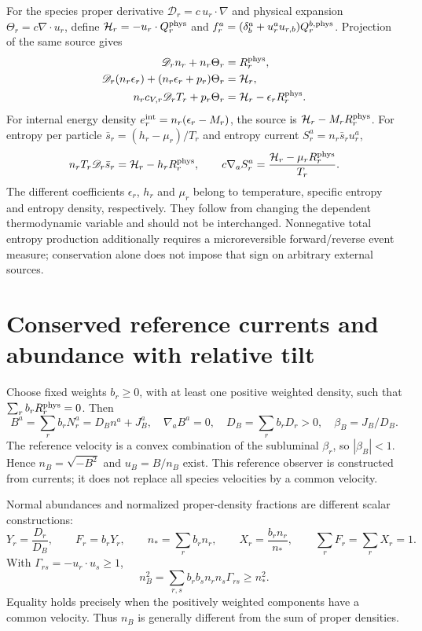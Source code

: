 For the species proper derivative $\mathscr D_r=c\,u_r\cdot\nabla$ and physical expansion $\Theta_r=c\nabla\cdot u_r$, define
$\mathcal H_r=-u_r\cdot Q_r^{\rm phys}$ and
$f_r^a=(\delta^a_b+u_r^au_{r,b})Q_r^{b,\rm phys}$.
Projection of the same source gives
\begin{align}
 \mathscr D_r n_r+n_r\Theta_r&=R_r^{\rm phys},\nonumber\\
 \mathscr D_r(n_r\epsilon_r)+(n_r\epsilon_r+p_r)\Theta_r&=\mathcal H_r,\nonumber\\
 n_rc_{V,r}\mathscr D_rT_r+p_r\Theta_r
                    &=\mathcal H_r-\epsilon_rR_r^{\rm phys}.
 \label{ii:first_law}
\end{align}
For internal energy density $e_r^{\rm int}=n_r(\epsilon_r-M_r)$, the source is $\mathcal H_r-M_rR_r^{\rm phys}$. For entropy per particle $\bar s_r=(h_r-\mu_r)/T_r$ and entropy current $S_r^a=n_r\bar s_ru_r^a$,
\begin{equation}
 n_rT_r\mathscr D_r\bar s_r=\mathcal H_r-h_rR_r^{\rm phys},\qquad
 c\nabla_aS_r^a=\frac{\mathcal H_r-\mu_rR_r^{\rm phys}}{T_r}.
 \label{ii:entropy}
\end{equation}
The different coefficients $\epsilon_r$, $h_r$ and $\mu_r$ belong to temperature, specific entropy and entropy density, respectively. They follow from changing the dependent thermodynamic variable and should not be interchanged. Nonnegative total entropy production additionally requires a microreversible forward/reverse event measure; conservation alone does not impose that sign on arbitrary external sources.

\section{Conserved reference currents and abundance with relative tilt}

Choose fixed weights $b_r\ge0$, with at least one positive weighted density, such that $\sum_rb_rR_r^{\rm phys}=0$. Then
\begin{equation}
 B^a=\sum_rb_rN_r^a=D_Bn^a+J_B^a,
 \quad \nabla_aB^a=0,
 \quad D_B=\sum_rb_rD_r>0,
 \quad \beta_B=J_B/D_B.
 \label{ii:reference}
\end{equation}
The reference velocity is a convex combination of the subluminal $\beta_r$, so $|\beta_B|<1$. Hence $n_B=\sqrt{-B^2}$ and $u_B=B/n_B$ exist. This reference observer is constructed from currents; it does not replace all species velocities by a common velocity.

Normal abundances and normalized proper-density fractions are different scalar constructions:
\begin{equation}
 Y_r=\frac{D_r}{D_B},\qquad F_r=b_rY_r,\qquad
 n_* =\sum_rb_rn_r,\qquad X_r=\frac{b_rn_r}{n_*},\qquad
 \sum_rF_r=\sum_rX_r=1.
 \label{ii:fractions}
\end{equation}
With $\Gamma_{rs}=-u_r\cdot u_s\ge1$,
\begin{equation}
 n_B^2=\sum_{r,s}b_rb_sn_rn_s\Gamma_{rs}\ge n_*^2.
 \label{ii:reference_norm}
\end{equation}
Equality holds precisely when the positively weighted components have a common velocity. Thus $n_B$ is generally different from the sum of proper densities.

